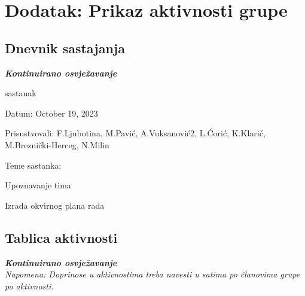 \chapter*{Dodatak: Prikaz aktivnosti grupe}
		
		\section*{Dnevnik sastajanja}
		
		\textbf{\textit{Kontinuirano osvježavanje}}\\
		
		\begin{packed_enum}
			\item  sastanak
			
			\item[] \begin{packed_item}
				\item Datum: October 19, 2023
				\item Prisustvovali: F.Ljubotina, M.Pavić, A.Vuksanović2, L.Ćorić, K.Klarić, M.Breznički-Herceg, N.Milin
				\item Teme sastanka:
				\begin{packed_item}
					\item  Upoznavanje tima 
					\item  Izrada okvirnog plana rada
				\end{packed_item}
			\end{packed_item}
			
			
		\end{packed_enum}
		
		\eject
		\section*{Tablica aktivnosti}
		
			\textbf{\textit{Kontinuirano osvježavanje}}\\
			
			 \textit{Napomena: Doprinose u aktivnostima treba navesti u satima po članovima grupe po aktivnosti.}

